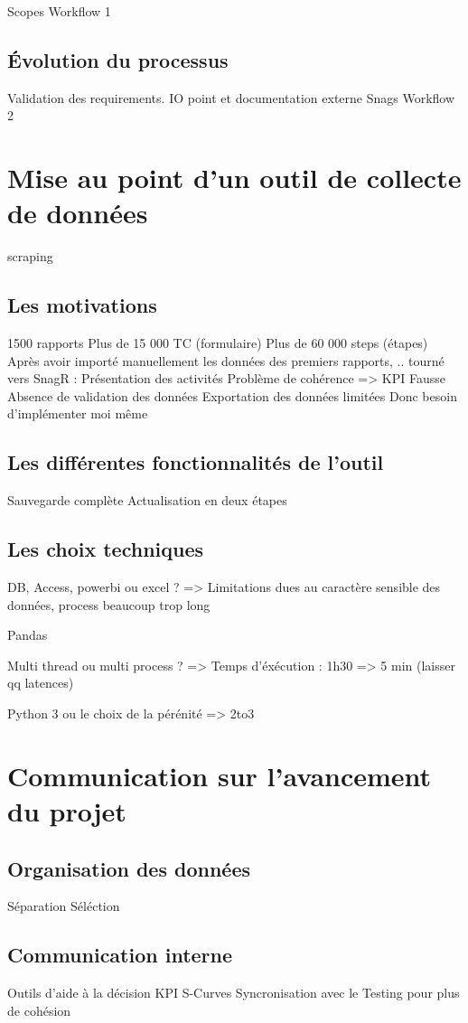 Scopes
Workflow 1
\subsection{Évolution du processus}

Validation des requirements.
IO point et documentation externe 
Snags
Workflow 2

\section{Mise au point d'un outil de collecte de données }

\gls{scraping}

\subsection{Les motivations}
1500 rapports
Plus de 15 000 TC (formulaire)
Plus de 60 000 steps (étapes)
Après avoir importé manuellement les données des premiers rapports, .. tourné vers SnagR :
Présentation des activités
Problème de cohérence
=> KPI Fausse
Absence de validation des données
Exportation des données limitées
Donc besoin d'implémenter moi même
\subsection{Les différentes fonctionnalités de l'outil}
Sauvegarde complète
Actualisation en deux étapes
\subsection{Les choix techniques}
DB, Access, powerbi ou excel ?
=> Limitations dues au caractère sensible des données, process beaucoup trop long

Pandas

Multi thread ou multi process ?
=> 
Temps d'éxécution : 1h30 => 5 min (laisser qq latences)

Python 3 ou le choix de la pérénité
=> 2to3

\section{Communication sur l'avancement du projet}
\subsection{Organisation des données}
Séparation
Séléction
\subsection{Communication interne}
Outils d'aide à la décision
KPI
S-Curves
Syncronisation avec le Testing pour plus de cohésion
